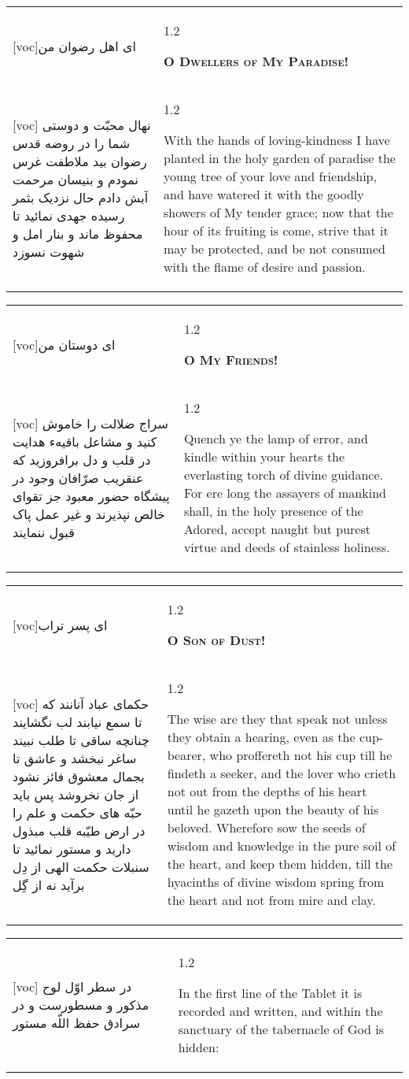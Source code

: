 \documentclass[11pt]{article}
\makeatletter
\newenvironment{orig}
  {\begin{farsi}[voc]}
  {\end{farsi}}
\newenvironment{trans}
  {\Large\begin{spacing}{1.2}\raggedright}
  {\end{spacing}}
\newenvironment{word}
  {\begin{tabular}[t]{p{2.75in}@{\hspace{3em}}p{2.75in}}}
  {\end{tabular}}
\newcommand{\ayat}[2]{\begin{orig}#1\end{orig} & \begin{trans}#2\end{trans}}
\newcommand{\heading}[2]{\textsc{\textbf{#1}} %
}
\makeatother
\begin{document}
\pagebreak

\begin{word}
\ayat{ای اهل رضوان من}{\heading{O Dwellers of My Paradise!}{}} \\ \ayat{
نهال محبّت و دوستی شما را در روضه قدس رضوان بيد ملاطفت غرس نمودم و بنيسان مرحمت آبش دادم حال نزديک بثمر رسيده جهدی نمائيد تا محفوظ ماند و بنار امل و شهوت نسوزد
}{
  With the hands of loving-kindness I have planted in the holy garden of
  paradise the young tree of your love and friendship, and have watered it
  with the goodly showers of My tender grace; now that the hour of its
  fruiting is come, strive that it may be protected, and be not consumed with
  the flame of desire and passion.
}
\end{word}

\pagebreak

\begin{word}
\ayat{ای دوستان من}{\heading{O My Friends!}{}} \\ \ayat{
سراج ضلالت را خاموش کنيد و مشاعل باقيهء هدايت در قلب و دل برافروزيد که عنقريب صرّافان وجود در پيشگاه حضور معبود جز تقوای خالص نپذيرند و غير عمل پاک قبول ننمايند
}{
  Quench ye the lamp of error, and kindle within your hearts the everlasting
  torch of divine guidance. For ere long the assayers of mankind shall, in the
  holy presence of the Adored, accept naught but purest virtue and deeds of
  stainless holiness.
}
\end{word}

\pagebreak

\begin{word}
\ayat{ای پسر تراب}{\heading{O Son of Dust!}{}} \\ \ayat{
حکمای عباد آنانند که تا سمع نيابند لب نگشايند چنانچه ساقی تا طلب نبيند ساغر نبخشد و عاشق تا بجمال معشوق فائز نشود از جان نخروشد
پس بايد حبّه های حکمت و علم را در ارض طيّبه قلب مبذول داريد و مستور نمائيد تا سنبلات حکمت الهی از دِل برآيد نه از گِل
}{
  The wise are they that speak not unless they obtain a hearing, even as the
  cup-bearer, who proffereth not his cup till he findeth a seeker, and the
  lover who crieth not out from the depths of his heart until he gazeth upon
  the beauty of his beloved. Wherefore sow the seeds of wisdom and knowledge
  in the pure soil of the heart, and keep them hidden, till the hyacinths of
  divine wisdom spring from the heart and not from mire and clay.
}
\end{word}

\pagebreak

\begin{word}
\ayat{
در سطر اوّل لوح مذکور و مسطورست و در سرادق حفظ اللّه مستور
}{
  In the first line of the Tablet it is recorded and written, and within the
  sanctuary of the tabernacle of God is hidden:
}
\end{word}
\end{document}
